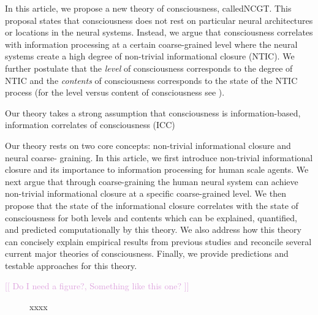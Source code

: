 \documentclass[utf8]{article}
\newcommand{\tname}{NCGT} 	%
\newcommand{\includegraphicsTodo}[2][]{%
            \tcbox[enhanced,
                center,
            	adjusted title=\large To Be Modified ...,
            	halign title=center,
            	attach boxed title to top left={yshift=-3mm, xshift=1cm,yshifttext=-1mm}, boxed title style={drop fuzzy shadow},
            	colbacktitle=RedOrange!70!black,
            	coltitle=white,
            	colframe=RedOrange!50!black,
            	colback=white
        	]{\texttt{[image: \#2]}}}
\newcommand{\idea}[2][Plum]{\noindent
				\textcolor{#1}{[[ #2 ]]}}
\begin{document}
		In this article, we propose a new theory of consciousness, called\ac{\tname}. This proposal states that consciousness does not rest on particular neural architectures or locations in the neural systems. Instead, we argue that consciousness correlates with information processing at a certain coarse-grained level where the neural systems create a high degree of non-trivial informational closure (NTIC). We further postulate that the \textit{level} of consciousness corresponds to the degree of NTIC and the \textit{contents} of consciousness corresponds to the state of the NTIC process (for the level versus content of consciousness see \cite{laureys2005neural, overgaard2010neural}).
		
		
		Our theory takes a strong assumption that consciousness is information-based, information correlates of consciousness (ICC)


		Our theory rests on two core concepts: non-trivial informational closure and neural coarse- graining. In this article, we first introduce non-trivial informational closure and its importance to information processing for human scale agents. We next argue that through coarse-graining the human neural system can achieve non-trivial informational closure at a specific coarse-grained level. We then propose that the state of the informational closure correlates with the state of consciousness for both levels and contents which can be explained, quantified, and predicted computationally by this theory. We also address how this theory can concisely explain empirical results from previous studies and reconcile several current major theories of consciousness. Finally, we provide predictions and testable approaches for this theory.


		\idea{Do I need a figure?, Something like this one?}
		\begin{figure}[H]
			\includegraphicsTodo[width=\textwidth/2]{WritingMaterials/PDFXCview_2018-06-11_13-37-34.png}
			\cite{pennartz2017consciousness}
			\caption{xxxx}
	   	\end{figure}
\end{document}
